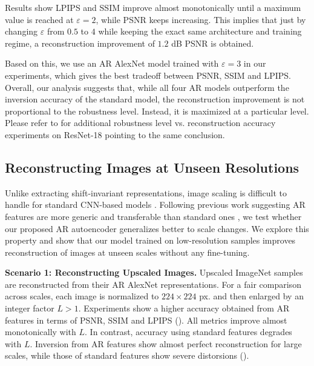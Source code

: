 Results show LPIPS and SSIM improve almost monotonically until a maximum value is reached at $\varepsilon=2$, while PSNR keeps increasing. This implies that just by changing $\varepsilon$ from $0.5$ to $4$ while keeping the exact same architecture and training regime, a reconstruction improvement of $1.2$ dB PSNR is obtained.

Based on this, we use an AR AlexNet model trained with $\varepsilon=3$ in our experiments, which gives the best tradeoff between PSNR, SSIM and LPIPS. Overall, our analysis suggests that, while all four AR models outperform the inversion accuracy of the standard model, the reconstruction improvement is not proportional to the robustness level. Instead, it is maximized at a particular level. Please refer to  for additional robustness level vs. reconstruction accuracy experiments on ResNet-18 pointing to the same conclusion.

\subsection{Reconstructing Images at Unseen Resolutions}
\label{sec:experimental_scale}

Unlike extracting shift-invariant representations, image scaling is difficult to handle for standard CNN-based models \cite{sosnovik_2019_scale,fan_2020_scale}. Following previous work suggesting AR features are more generic and transferable than standard ones \cite{chen2020shape,salman_2020_adversarially}, we test whether our proposed AR autoencoder generalizes better to scale changes. We explore this property and show that our model trained on low-resolution samples improves reconstruction of images at unseen scales without any fine-tuning.

\textbf{Scenario 1: Reconstructing Upscaled Images.} Upscaled ImageNet samples are reconstructed from their AR AlexNet  representations. For a fair comparison across scales, each image is normalized to $224 \times 224$ px. and then enlarged by an integer factor $L>1$. Experiments show a higher accuracy obtained from AR features in terms of PSNR, SSIM and LPIPS (). All metrics improve almost monotonically with $L$. In contrast, accuracy using standard features degrades with $L$.
Inversion from AR features show almost perfect reconstruction for large scales, while those of standard features show severe distorsions ().





